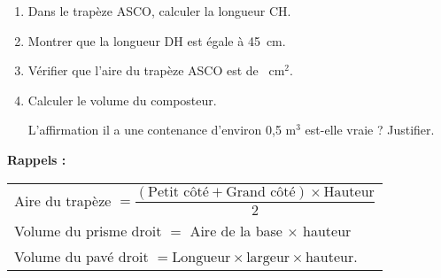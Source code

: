\begin{enumerate}
	\begin{enumerate}
		\item Dans le trapèze ASCO, calculer la longueur CH.
		\item Montrer que la longueur DH est égale à 45~cm.
		\item Vérifier que l'aire du trapèze ASCO est de ~cm$^2$.
		\item Calculer le volume du composteur.
		
L'affirmation \og il a une contenance d'environ 0,5 m$^3$ \fg{} est-elle vraie ? Justifier.
	\end{enumerate}
\end{enumerate}	
\medskip

\textbf{Rappels :}

\begin{tabularx}{\linewidth}{|X|}\hline
Aire du trapèze $ = \dfrac{(\text{Petit côté} + \text{Grand côté}) \times \text{Hauteur}}{2}$\rule[-3mm]{0mm}{9mm}\\
Volume du prisme droit $=$ Aire de la base $\times$  hauteur \\
Volume du pavé droit $= \text{Longueur} \times \text{largeur} \times  \text{hauteur}$.\\ \hline
\end{tabularx}

